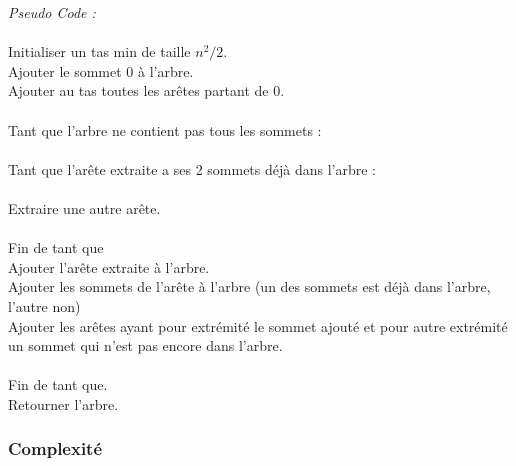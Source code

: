 \documentclass[a4paper,11pt]{article}
\begin{document}
\textit{Pseudo Code :}\\
\\
Initialiser un tas min de taille $n^2/2$.\\
Ajouter le sommet 0 à l'arbre.\\
Ajouter au tas toutes les arêtes partant de 0.\\
\\
Tant que l'arbre ne contient pas tous les sommets :\\
\\
\hspace*{1cm}Tant que l'arête extraite a ses 2 sommets déjà dans l'arbre :\\
\\
\hspace*{2cm}Extraire une autre arête.\\
\\
\hspace*{1cm}Fin de tant que\\
\hspace*{1cm}Ajouter l'arête extraite à l'arbre.\\
\hspace*{1cm}Ajouter les sommets de l'arête à l'arbre (un des sommets est déjà dans l'arbre, l'autre non)\\
\hspace*{1cm}Ajouter les arêtes ayant pour extrémité le sommet ajouté et pour autre extrémité un sommet qui n'est pas encore dans l'arbre.\\
\\
Fin de tant que.\\
Retourner l'arbre.\\

\subsubsection*{Complexité}
\end{document}
